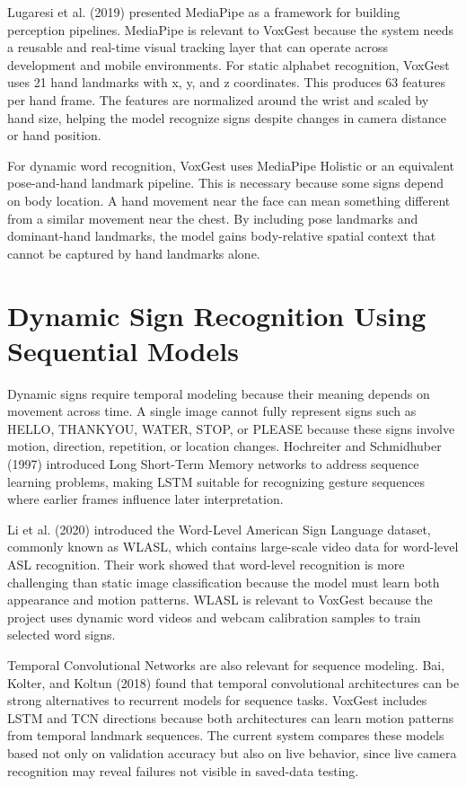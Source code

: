 Lugaresi et al. (2019) presented MediaPipe as a framework for building perception pipelines. MediaPipe is relevant to VoxGest because the system needs a reusable and real-time visual tracking layer that can operate across development and mobile environments. For static alphabet recognition, VoxGest uses 21 hand landmarks with x, y, and z coordinates. This produces 63 features per hand frame. The features are normalized around the wrist and scaled by hand size, helping the model recognize signs despite changes in camera distance or hand position.

For dynamic word recognition, VoxGest uses MediaPipe Holistic or an equivalent pose-and-hand landmark pipeline. This is necessary because some signs depend on body location. A hand movement near the face can mean something different from a similar movement near the chest. By including pose landmarks and dominant-hand landmarks, the model gains body-relative spatial context that cannot be captured by hand landmarks alone.

\section{Dynamic Sign Recognition Using Sequential Models}

Dynamic signs require temporal modeling because their meaning depends on movement across time. A single image cannot fully represent signs such as HELLO, THANKYOU, WATER, STOP, or PLEASE because these signs involve motion, direction, repetition, or location changes. Hochreiter and Schmidhuber (1997) introduced Long Short-Term Memory networks to address sequence learning problems, making LSTM suitable for recognizing gesture sequences where earlier frames influence later interpretation.

Li et al. (2020) introduced the Word-Level American Sign Language dataset, commonly known as WLASL, which contains large-scale video data for word-level ASL recognition. Their work showed that word-level recognition is more challenging than static image classification because the model must learn both appearance and motion patterns. WLASL is relevant to VoxGest because the project uses dynamic word videos and webcam calibration samples to train selected word signs.

Temporal Convolutional Networks are also relevant for sequence modeling. Bai, Kolter, and Koltun (2018) found that temporal convolutional architectures can be strong alternatives to recurrent models for sequence tasks. VoxGest includes LSTM and TCN directions because both architectures can learn motion patterns from temporal landmark sequences. The current system compares these models based not only on validation accuracy but also on live behavior, since live camera recognition may reveal failures not visible in saved-data testing.

